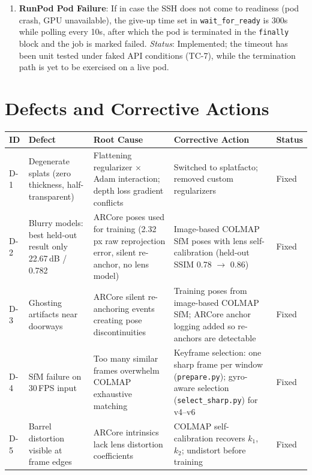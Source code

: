 \begin{enumerate}
    \item \textbf{RunPod Pod Failure}: If in case the SSH does not come to readiness (pod crash, GPU unavailable), the give-up time set in \texttt{wait\_for\_ready} is 300s while polling every 10s, after which the pod is terminated in the \texttt{finally} block and the job is marked failed. \emph{Status}: Implemented; the timeout has been unit tested under faked API conditions (TC-7), while the termination path is yet to be exercised on a live pod.
\end{enumerate}

\section{Defects and Corrective Actions}

{\footnotesize\setlength{\tabcolsep}{3pt}
\begin{longtable}{p{}p{}p{}p{}p{}}
\toprule
\textbf{ID} & \textbf{Defect} & \textbf{Root Cause} & \textbf{Corrective Action} & \textbf{Status} \\
\midrule
D-1 & Degenerate splats (zero thickness, half-transparent) & Flattening regularizer $\times$ Adam interaction; depth loss gradient conflicts & Switched to splatfacto; removed custom regularizers & Fixed \\
D-2 & Blurry models: best held-out result only 22.67\,dB / 0.782 & ARCore poses used for training (2.32\,px raw reprojection error, silent re-anchor, no lens model) & Image-based COLMAP SfM poses with lens self-calibration (held-out SSIM 0.78 $\rightarrow$ 0.86) & Fixed \\
D-3 & Ghosting artifacts near doorways & ARCore silent re-anchoring events creating pose discontinuities & Training poses from image-based COLMAP SfM; ARCore anchor logging added so re-anchors are detectable & Fixed \\
D-4 & SfM failure on 30\,FPS input & Too many similar frames overwhelm COLMAP exhaustive matching & Keyframe selection: one sharp frame per window (\texttt{prepare.py}); gyro-aware selection (\texttt{select\_sharp.py}) for v4--v6 & Fixed \\
D-5 & Barrel distortion visible at frame edges & ARCore intrinsics lack lens distortion coefficients & COLMAP self-calibration recovers $k_1$, $k_2$; undistort before training & Fixed \\
\bottomrule
\end{longtable}
}

